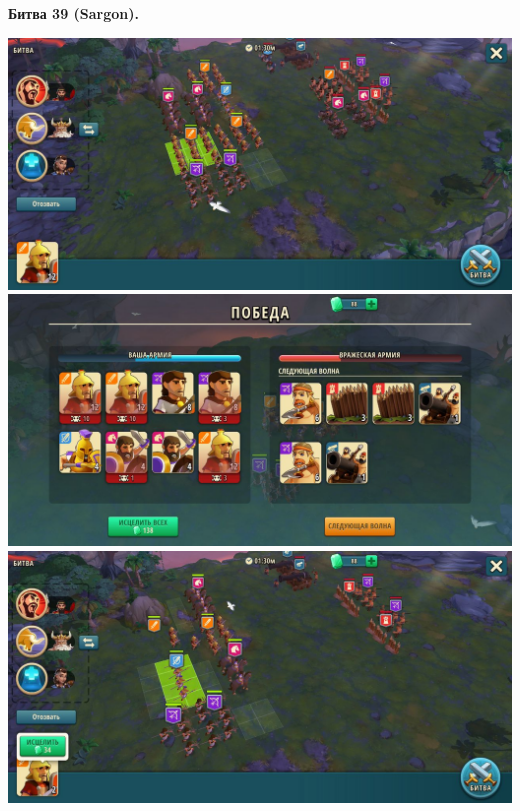 \newpage
\begin{center}
	\hypertarget{fight39}{\textbf{Битва 39 (Sargon).}}
\end{center}
\noindent\includegraphics[width=\linewidth]{./parts/media/TreasureHunt/39/sargon/photo_2022-04-07_13-18-09.jpg} \newline
\noindent\includegraphics[width=\linewidth]{./parts/media/TreasureHunt/39/sargon/photo_2022-04-07_13-18-21.jpg} \newline
\noindent\includegraphics[width=\linewidth]{./parts/media/TreasureHunt/39/sargon/photo_2022-04-07_13-18-26.jpg} \newline
